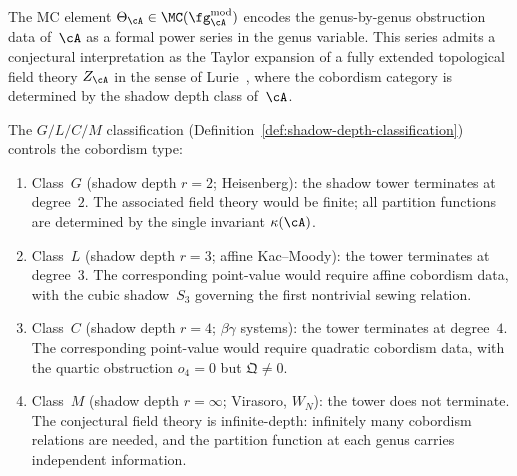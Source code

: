 \begin{remark}

\label{rem:shadow-tower-tqft-taylor}
\ClaimStatusHeuristic
{}
The MC element $\Theta_\cA \in \MC(\fg^{\mathrm{mod}}_\cA)$
encodes the genus-by-genus obstruction data of~$\cA$ as a formal
power series in the genus variable. This series admits a conjectural
interpretation as the Taylor expansion of a fully extended
topological field theory $Z_\cA$ in the sense of
Lurie~\cite{Lurie09TFT}, where the cobordism category is
determined by the shadow depth class of~$\cA$.

The $G/L/C/M$ classification
(Definition~\ref{def:shadow-depth-classification})
controls the cobordism type:
\begin{enumerate}[label=\textup{(\roman*)}]
\item Class~$G$ (shadow depth $r = 2$; Heisenberg):
 the shadow tower terminates at degree~$2$.
 The associated field theory would be finite;
 all partition functions are determined by the single
 invariant $\kappa(\cA)$.
\item Class~$L$ (shadow depth $r = 3$; affine Kac--Moody):
 the tower terminates at degree~$3$.
 The corresponding point-value would require affine cobordism data,
 with the cubic shadow~$S_3$ governing the first
 nontrivial sewing relation.
\item Class~$C$ (shadow depth $r = 4$; $\beta\gamma$ systems):
 the tower terminates at degree~$4$.
 The corresponding point-value would require quadratic cobordism data,
 with the quartic obstruction $o_4 = 0$ but
 $\mathfrak{Q} \neq 0$.
\item Class~$M$ (shadow depth $r = \infty$; Virasoro, $W_N$):
 the tower does not terminate.
 The conjectural field theory is infinite-depth: infinitely many
 cobordism relations are needed, and the partition function
 at each genus carries independent information.
\end{enumerate}


\end{remark}
